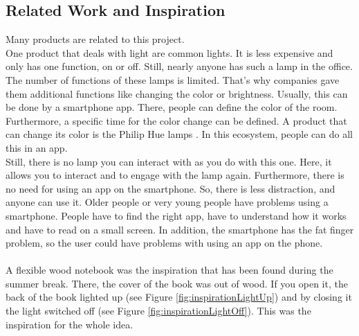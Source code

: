 \documentclass[04_projectProcess.tex]{subfiles}
\begin{document}
    \subsection{Related Work and Inspiration}
        \begin{flushleft}
            Many products are related to this project. \\
            
            One product that deals with light are common lights. It is less expensive and 
            only has one function, on or off. Still, nearly anyone has such a lamp in the 
            office. \\

            The number of functions of these lamps is limited. That's why companies 
            gave them additional functions like changing the color or brightness. Usually, 
            this can be done by a smartphone app. There, people can define the color of the 
            room. Furthermore, a specific time for the color change can be defined. A 
            product that can change its color is the Philip Hue lamps \cite{philipHue}. 
            In this ecosystem, people can do all this in an app.  \\ 

            Still, there is no lamp you can interact with as you do with this one. Here, it 
            allows you to interact and to engage with the lamp again. Furthermore, there is no 
            need for using an app on the smartphone. So, there is less distraction, and anyone 
            can use it. Older people or very young people have problems using a smartphone. 
            People have to find the right app, have to understand how it works and have to read 
            on a small screen. In addition, the smartphone has the fat finger problem, so the 
            user could have problems with using an app on the phone.\\~\\

            A flexible wood notebook was the inspiration that has been found during the summer
            break. There, the cover of the book was out of wood. If you open it, the back of the
            book lighted up (see Figure \ref{fig:inspirationLightUp}) and by closing it the 
            light switched off (see Figure \ref{fig:inspirationLightOff}). This was the 
            inspiration for the whole idea. 


\end{flushleft}
\end{document}
